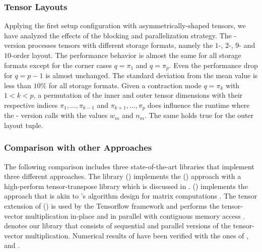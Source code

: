 \subsubsection{Tensor Layouts}
Applying the first setup configuration with asymmetrically-shaped tensors, we have analyzed the effects of the blocking and parallelization strategy.
The - version processes tensors with different storage formats, namely the $1$-, $2$-, $9$- and $10$-order layout.
The performance behavior is almost the same for all storage formats except for the corner cases $q = \pi_1$ and $q = \pi_p$.
Even the performance drop for $q = p-1$ is almost unchanged.
The standard deviation from the mean value is less than $10$\% for all storage formats.
Given a contraction mode $q = \pi_k$ with $1 < k < p$, a permutation of the inner and outer tensor dimensions with their respective indices $\pi_1, \dots,  \pi_{k-1}$ and $\pi_{k+1}, \dots, \pi_{p}$ does influence the runtime where the - version calls  with the values $w_m$ and $n_m$.
The same holds true for the outer layout tuple.



\subsubsection{Comparison with other Approaches}
The following comparison includes three state-of-the-art libraries that implement three different approaches.
The library  () implements the () approach with a high-perform tensor-transpose library  which is discussed in \cite{springer:2018:design}.
 () implements the  approach that is akin to 's algorithm design for matrix computations \cite{matthews:2018:high}.
The tensor extension of  () is used by the Tensorflow framework and performs the tensor-vector multiplication in-place and in parallel with contiguous memory access \cite{abadi:2016:tensorflow}.
 denotes our library that consists of sequential and parallel versions of the tensor-vector multiplication.
Numerical results of  have been verified with the ones of ,  and .


